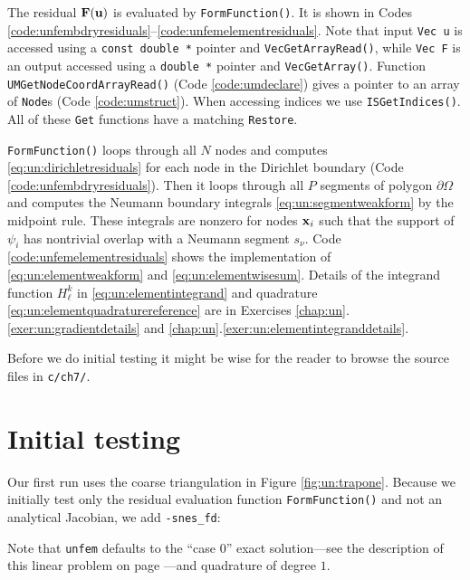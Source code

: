 The residual $\mathbf{F}(\mathbf{u})$ is evaluated by \texttt{FormFunction()}.  It is shown in Codes \ref{code:unfembdryresiduals}--\ref{code:unfemelementresiduals}.  Note that input \texttt{Vec u} is accessed using a \texttt{const double *} pointer and \texttt{VecGetArrayRead()}, while \texttt{Vec F} is an output accessed using a \texttt{double *} pointer and \texttt{VecGetArray()}.  Function \texttt{UMGetNodeCoordArrayRead()} (Code \ref{code:umdeclare}) gives a pointer to an array of \texttt{Node}s (Code \ref{code:umstruct}).  When accessing indices we use \texttt{ISGetIndices()}.  All of these \texttt{Get} functions have a matching \texttt{Restore}.



\texttt{FormFunction()} loops through all $N$ nodes and computes \eqref{eq:un:dirichletresiduals} for each node in the Dirichlet boundary (Code \ref{code:unfembdryresiduals}).  Then it loops through all $P$ segments of polygon $\partial \Omega$ and computes the Neumann boundary integrals \eqref{eq:un:segmentweakform} by the midpoint rule.  These integrals are nonzero for nodes $\mathbf{x}_i$ such that the support of $\psi_i$ has nontrivial overlap with a Neumann segment $s_\nu$.  Code \ref{code:unfemelementresiduals} shows the implementation of \eqref{eq:un:elementweakform} and \eqref{eq:un:elementwisesum}.  Details of the integrand function $H_\ell^k$ in \eqref{eq:un:elementintegrand} and quadrature \eqref{eq:un:elementquadraturereference} are in Exercises \ref{chap:un}.\ref{exer:un:gradientdetails} and \ref{chap:un}.\ref{exer:un:elementintegranddetails}.

Before we do initial testing it might be wise for the reader to browse the source files in \texttt{c/ch7/}.


\section{Initial testing}

Our first run uses the coarse triangulation in Figure \ref{fig:un:trapone}.  Because we initially test only the residual evaluation function \texttt{FormFunction()} and not an analytical Jacobian, we add \texttt{-snes\_fd}:
Note that \texttt{unfem} defaults to the ``case $0$'' exact solution---see the description of this linear problem on page \pageref{eq:un:exactsolution}---and quadrature of degree $1$.

